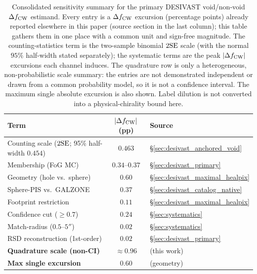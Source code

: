 \documentclass[aps,prd,twocolumn,superscriptaddress,showpacs,preprintnumbers,nofootinbib,longbibliography,floatfix]{revtex4-2}
\begin{document}
\begin{table}[ht]
\caption{Consolidated sensitivity summary for the primary DESIVAST
void/non-void $\Delta f_{\rm CW}$ estimand. Every entry is a
$\Delta f_{\rm CW}$ excursion (percentage points) already reported
elsewhere in this paper (source section in the last column); this table
gathers them in one place with a common unit and sign-free magnitude.
The counting-statistics term is the two-sample binomial $2{\rm SE}$
scale (with the normal $95\%$ half-width stated separately); the systematic terms are the peak $|\Delta f_{\rm CW}|$
excursions each channel induces. The quadrature row is only a
heterogeneous, non-probabilistic scale summary: the entries are not
demonstrated independent or drawn from a common probability model, so it
is not a confidence interval. The maximum single absolute excursion is
also shown. Label dilution is not converted into a physical-chirality
bound here.}
\label{tab:systematic_budget}
{\small
\begin{ruledtabular}
\begin{tabular}{lcl}
Term & $|\Delta f_{\rm CW}|$ (pp) & Source \\
\hline
Counting scale ($2{\rm SE}$; 95\% half-width $0.454$) & $0.463$ & \S\ref{sec:desivast_anchored_void} \\
Membership (FoG MC)              & $0.34$--$0.37$ & \S\ref{sec:desivast_primary} \\
Geometry (hole vs.\ sphere)      & $0.60$ & \S\ref{sec:desivast_maximal_healpix} \\
Sphere-PIS vs.\ GALZONE          & $0.37$ & \S\ref{sec:desivast_catalog_native} \\
Footprint restriction            & $0.11$ & \S\ref{sec:desivast_maximal_healpix} \\
Confidence cut ($\ge 0.7$)       & $0.24$ & \S\ref{sec:systematics} \\
Match-radius ($0.5$--$5''$)      & $0.02$ & \S\ref{sec:systematics} \\
RSD reconstruction (1st-order)   & $0.02$ & \S\ref{sec:desivast_primary} \\
\hline
\textbf{Quadrature scale (non-CI)} & $\approx 0.96$ & (this work) \\
\textbf{Max single excursion}    & $0.60$ & (geometry) \\
\end{tabular}
\end{ruledtabular}
}
\end{table}
\end{document}
